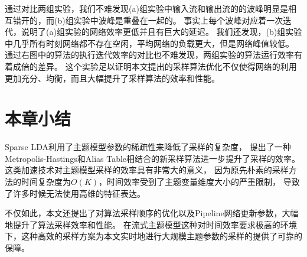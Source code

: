 通过对比两组实验，我们不难发现(a)组实验中输入流和输出流的的波峰明显是相互错开的，而(b)组实验中波峰是重叠在一起的。
事实上每个波峰对应着一次迭代，说明了(a)组实验的网络效率更低并且有巨大的延迟。
我们还发现，(b)组实验中几乎所有时刻网络都不存在空闲，平均网络的负载更大，但是网络峰值较低。
通过右图中的算法的执行迭代效率的对比也不难发现，两组实验的算法运行效率有着成倍的差异。
这个实验足以证明本文提出的采样算法优化不仅使得网络的利用更加充分、均衡，而且大幅提升了采样算法的效率和性能。

\section{本章小结}
Sparse LDA利用了主题模型参数的稀疏性来降低了采样的复杂度，
提出了一种Metropolis-Hastings和Alias Table相结合的新采样算法进一步提升了采样的效率。
这类加速技术对主题模型采样的效率具有非常大的意义，
因为原先朴素的采样方法的时间复杂度为$O(K)$，时间效率受到了主题变量维度大小的严重限制，
导致了许多时候无法使用高维的特征表达。

不仅如此，本文还提出了对算法采样顺序的优化以及Pipeline网络更新参数，大幅地提升了算法采样效率和性能。
在流式主题模型这种对时间效率要求极高的环境下，这种高效的采样方案为本文实时地进行大规模主题参数的采样的提供了可靠的保障。

